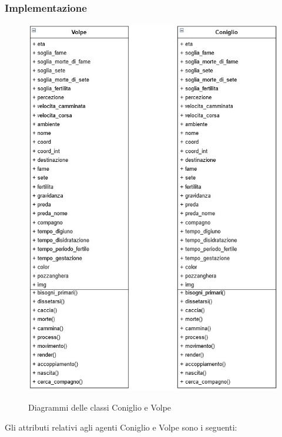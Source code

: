 \documentclass[11pt]{article}
\begin{document}
\subsubsection{Implementazione}
\begin{figure}[h!]
     \centering
     \includegraphics[scale = 0.7]{Animale.png}
     \label{fig:ConiglioVolpeUML}
     \caption{Diagrammi delle classi Coniglio e Volpe}
\end{figure}
Gli attributi relativi agli agenti Coniglio e Volpe sono i seguenti: 
\end{document}
